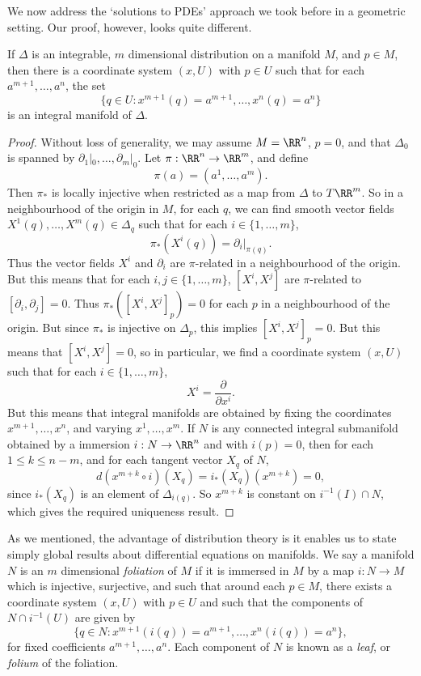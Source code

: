 We now address the `solutions to PDEs' approach we took before in a geometric setting. Our proof, however, looks quite different.

\begin{theorem}
    If $\Delta$ is an integrable, $m$ dimensional distribution on a manifold $M$, and $p \in M$, then there is a coordinate system $(x,U)$ with $p \in U$ such that for each $a^{m+1}, \dots, a^n$, the set
    \[ \{ q \in U: x^{m+1}(q) = a^{m+1}, \dots, x^n(q) = a^n \} \]
    is an integral manifold of $\Delta$.
\end{theorem}
\begin{proof}
   Without loss of generality, we may assume $M = \RR^n$, $p = 0$, and that $\Delta_0$ is spanned by $\partial_1|_0, \dots, \partial_m|_0$. Let $\pi: \RR^n \to \RR^m$, and define
   \[ \pi(a) = (a^1, \dots, a^m). \]
   Then $\pi_*$ is locally injective when restricted as a map from $\Delta$ to $T\RR^m$. So in a neighbourhood of the origin in $M$, for each $q$, we can find smooth vector fields $X^1(q), \dots, X^m(q) \in \Delta_q$ such that for each $i \in \{ 1, \dots, m \}$,
   \[ \pi_*(X^i(q)) = \left. \partial_i \right|_{\pi(q)}. \]
   Thus the vector fields $X^i$ and $\partial_i$ are $\pi$-related in a neighbourhood of the origin. But this means that for each $i,j \in \{ 1, \dots, m \}$, $[X^i,X^j]$ are $\pi$-related to $[\partial_i,\partial_j] = 0$. Thus $\pi_*([X^i,X^j]_p) = 0$ for each $p$ in a neighbourhood of the origin. But since $\pi_*$ is injective on $\Delta_p$, this implies $[X^i,X^j]_p = 0$. But this means that $[X^i,X^j] = 0$, so in particular, we find a coordinate system $(x,U)$ such that for each $i \in \{ 1, \dots, m \}$,
   \[ X^i = \frac{\partial}{\partial x^i}. \]
   But this means that integral manifolds are obtained by fixing the coordinates $x^{m+1}, \dots, x^n$, and varying $x^1, \dots, x^m$. If $N$ is any connected integral submanifold obtained by a immersion $i: N \to \RR^n$ and with $i(p) = 0$, then for each $1 \leq k \leq n-m$, and for each tangent vector $X_q$ of $N$,
   \[ d(x^{m+k} \circ i)(X_q) = i_*(X_q)(x^{m+k}) = 0, \]
   since $i_*(X_q)$ is an element of $\Delta_{i(q)}$. So $x^{m+k}$ is constant on $i^{-1}(I) \cap N$, which gives the required uniqueness result.
 \end{proof}

As we mentioned, the advantage of distribution theory is it enables us to state simply global results about differential equations on manifolds. We say a manifold $N$ is an $m$ dimensional \emph{foliation} of $M$ if it is immersed in $M$ by a map $i: N \to M$ which is injective, surjective, and such that around each $p \in M$, there exists a coordinate system $(x,U)$ with $p \in U$ and such that the components of $N \cap i^{-1}(U)$ are given by
%
\[ \{ q \in N: x^{m+1}(i(q)) = a^{m+1}, \dots, x^n(i(q)) = a^n \}, \]
%
for fixed coefficients $a^{m+1}, \dots, a^n$. Each component of $N$ is known as a \emph{leaf}, or \emph{folium} of the foliation.

